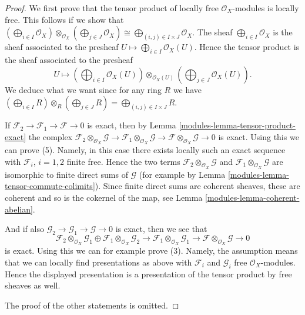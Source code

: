 \begin{proof}

We first prove that the tensor product of locally free
$\mathcal{O}_X$-modules is locally free. This follows if we show
that
$(\bigoplus_{i \in I} \mathcal{O}_X) \otimes_{\mathcal{O}_X}
(\bigoplus_{j \in J} \mathcal{O}_X) \cong
\bigoplus_{(i, j) \in I \times J} \mathcal{O}_X$.
The sheaf $\bigoplus_{i \in I} \mathcal{O}_X$ is the sheaf associated
to the presheaf $U \mapsto \bigoplus_{i \in I} \mathcal{O}_X(U)$.
Hence the tensor product is the sheaf associated
to the presheaf
$$
U \longmapsto
(\bigoplus\nolimits_{i \in I} \mathcal{O}_X(U))
\otimes_{\mathcal{O}_X(U)}
(\bigoplus\nolimits_{j \in J} \mathcal{O}_X(U)).
$$
We deduce what we want since for any ring $R$ we have
$(\bigoplus_{i \in I} R) \otimes_R (\bigoplus_{j \in J} R) =
\bigoplus_{(i, j) \in I \times J} R$.

\medskip\noindent
If $\mathcal{F}_2 \to \mathcal{F}_1 \to \mathcal{F} \to 0$
is exact, then by Lemma \ref{modules-lemma-tensor-product-exact}
the complex
$\mathcal{F}_2 \otimes_{\mathcal{O}_X} \mathcal{G} \to
\mathcal{F}_1 \otimes_{\mathcal{O}_X} \mathcal{G} \to
\mathcal{F} \otimes_{\mathcal{O}_X} \mathcal{G} \to 0$
is exact. Using this we can prove (5). Namely, in this case there
exists locally such an exact sequence with $\mathcal{F}_i$, $i = 1, 2$
finite free. Hence the two terms
$\mathcal{F}_2 \otimes_{\mathcal{O}_X} \mathcal{G}$ and
$\mathcal{F}_1 \otimes_{\mathcal{O}_X} \mathcal{G}$
are isomorphic to finite direct sums of $\mathcal{G}$ (for example
by Lemma \ref{modules-lemma-tensor-commute-colimits}).
Since finite direct sums are coherent sheaves, these are coherent
and so is the cokernel of the map, see Lemma \ref{modules-lemma-coherent-abelian}.

\medskip\noindent
And if also
$\mathcal{G}_2 \to \mathcal{G}_1 \to \mathcal{G} \to 0$
is exact, then we see that
$$
\mathcal{F}_2 \otimes_{\mathcal{O}_X} \mathcal{G}_1
\oplus
\mathcal{F}_1 \otimes_{\mathcal{O}_X} \mathcal{G}_2
\to
\mathcal{F}_1 \otimes_{\mathcal{O}_X} \mathcal{G}_1
\to
\mathcal{F} \otimes_{\mathcal{O}_X} \mathcal{G}
\to 0
$$
is exact. Using this we can for example prove (3).
Namely, the assumption means that we can locally find presentations
as above with $\mathcal{F}_i$ and $\mathcal{G}_i$
free $\mathcal{O}_X$-modules. Hence the displayed presentation
is a presentation of the tensor product by free sheaves as well.

\medskip\noindent
The proof of the other statements is omitted.
\end{proof}

